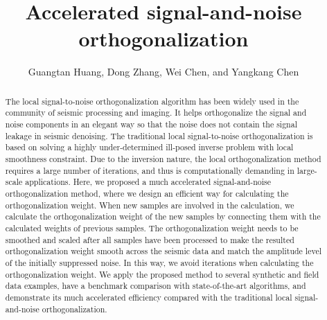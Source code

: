 
\DeclareRobustCommand{\dlo}[1]{}
\DeclareRobustCommand{\wen}[1]{#1}
\DeclareRobustCommand{\old}[1]{}
\DeclareRobustCommand{\new}[1]{#1}



\title{Accelerated signal-and-noise orthogonalization}
\renewcommand{\thefootnote}{\fnsymbol{footnote}}
\author{Guangtan Huang, Dong Zhang, Wei Chen, and Yangkang Chen}
\maketitle

\begin{abstract}
The local signal-to-noise orthogonalization algorithm has been widely used in the community of seismic processing and imaging. It helps orthogonalize the signal and noise components in an elegant way so that the noise does not contain the signal leakage in seismic denoising. %
The traditional local signal-to-noise orthogonalization is based on solving a highly under-determined ill-posed inverse problem with local smoothness constraint. Due to the inversion nature, the local orthogonalization method requires a large number of iterations, and thus is computationally demanding in large-scale applications. Here, we proposed a much accelerated signal-and-noise orthogonalization method, where we design an efficient way for calculating the orthogonalization weight. When new samples are involved in the calculation, we calculate the orthogonalization weight of the new samples by connecting them with the calculated weights of previous samples. The orthogonalization weight needs to be smoothed and scaled after all samples have been processed to make the resulted orthogonalization weight smooth across the seismic data and match the amplitude level of the initially suppressed noise. In this way, we avoid iterations when calculating the orthogonalization weight. We apply the proposed method to several synthetic and field data examples, have a benchmark comparison with state-of-the-art algorithms, and demonstrate its much accelerated efficiency compared with the traditional local signal-and-noise orthogonalization.
\end{abstract}

